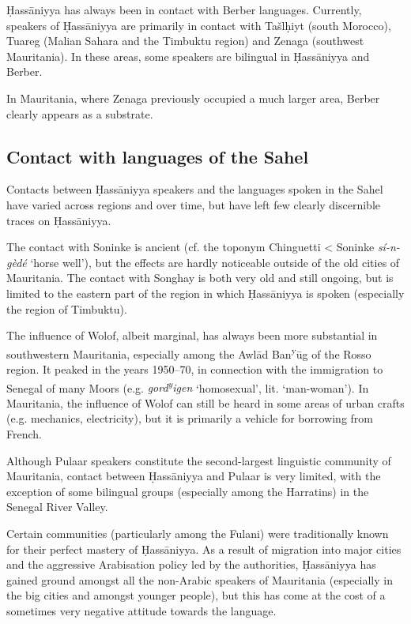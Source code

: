 \documentclass[output=paper]{langsci/langscibook}
\begin{document}
Ḥassāniyya has always been in contact with Berber languages. Currently, speakers of Ḥassāniyya are primarily in contact with Tašlḥiyt (south Morocco), Tuareg (Malian Sahara and the Timbuktu region) and Zenaga (southwest Mauritania). In these areas, some speakers are bilingual in Ḥassāniyya and Berber. 

In Mauritania, where Zenaga previously occupied a much larger area, Berber clearly appears as a substrate.

\subsection{ Contact with languages of the Sahel} %

Contacts between Ḥassāniyya speakers and the languages spoken in the Sahel have varied across regions and over time, but have left few clearly discernible traces on Ḥassāniyya.

The contact with Soninke is ancient (cf. the toponym Chinguetti < Soninke \textit{sí-n-gèdé} ‘horse well’), but the effects are hardly noticeable outside of the old cities of Mauritania. The contact with Songhay is both very old and still ongoing, but is limited to the eastern part of the region in which Ḥassāniyya is spoken (especially the region of Timbuktu).

The influence of Wolof, albeit marginal, has always been more substantial in southwestern Mauritania, especially among the Awlād Ban\textsuperscript{y}ūg of the Rosso region. It peaked in the years 1950–70, in connection with the immigration to Senegal of many Moors (e.g. \textit{gord\textsuperscript{y}}\textit{igen} ‘homosexual’, lit. ‘man-woman’). In Mauritania, the influence of Wolof can still be heard in some areas of urban crafts (e.g. mechanics, electricity), but it is primarily a vehicle for borrowing from French.

Although Pulaar speakers constitute the second-largest linguistic community of Mauritania, contact between Ḥassāniyya and Pulaar is very limited, with the exception of some bilingual groups (especially among the Harratins) in the Senegal River Valley.

Certain communities (particularly among the Fulani) were traditionally known for their perfect mastery of Ḥassāniyya. As a result of migration into major cities and the aggressive Arabisation policy led by the authorities, Ḥassāniyya has gained ground amongst all the non-Arabic speakers of Mauritania (especially in the big cities and amongst younger people), but this has come at the cost of a sometimes very negative attitude towards the language. 
\end{document}
